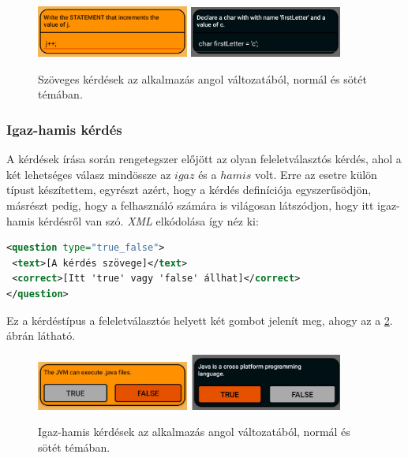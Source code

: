 \documentclass[12pt,a4paper]{article}
\newcommand{\xml}{\textit{XML}\xspace}
\begin{document}
	\begin{figure}[h!]
		\centering
		\includegraphics[width=5cm]{question_text}
		\includegraphics[width=5cm]{question_text_dark}
		\caption{Szöveges kérdések az alkalmazás angol változatából, normál és sötét témában.}
		\label{question_text_figure}
	\end{figure}

	\subsubsection{Igaz-hamis kérdés}
	
	A kérdések írása során rengetegszer előjött az olyan feleletválasztós kérdés, ahol a két lehetséges válasz mindössze az $igaz$ és a $hamis$ volt. Erre az esetre külön típust készítettem, egyrészt azért, hogy a kérdés definíciója egyszerűsödjön, másrészt pedig, hogy a felhasználó számára is világosan látszódjon, hogy itt igaz-hamis kérdésről van szó. \xml elkódolása így néz ki:
	
	\begin{lstlisting}[language=XML]	
<question type="true_false">
 <text>[A kérdés szövege]</text>
 <correct>[Itt 'true' vagy 'false' állhat]</correct>
</question>
	\end{lstlisting}
	
	Ez a kérdéstípus a feleletválasztós helyett két gombot jelenít meg, ahogy az a \ref{question_true_false_figure}. ábrán látható.
	
	\begin{figure}[h!]
		\centering
		\includegraphics[width=5cm]{question_true_false}
		\includegraphics[width=5cm]{question_true_false_dark}
		\caption{Igaz-hamis kérdések az alkalmazás angol változatából, normál és sötét témában.}
		\label{question_true_false_figure}
	\end{figure}
	
\end{document}
